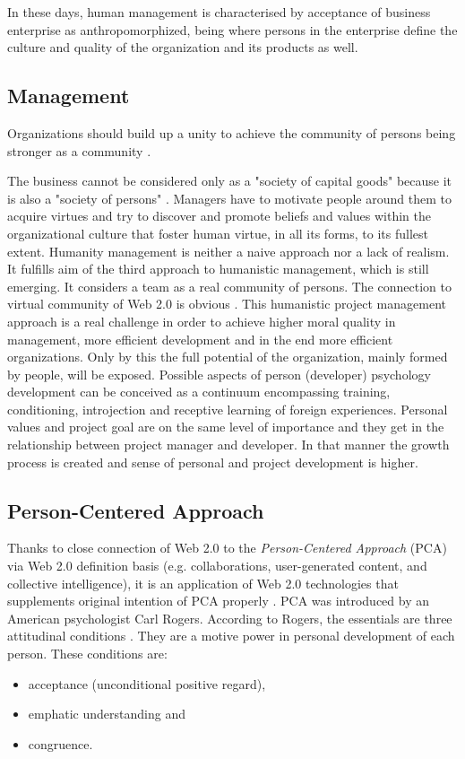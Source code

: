 \documentclass[graybox]{svmult}
\begin{document}
In these days, human management is characterised by acceptance of business
enterprise as anthropomorphized, being where persons in the enterprise define
the culture and quality of the organization and its products as well.

\subsection{Management}
Organizations should build up a unity to achieve the community of persons
being stronger as a community \cite{mele2003challenge}.

The business cannot be considered only as a "society of capital goods" because
it is also a "society of persons" \cite{paul1991centesimus}. Managers have to
motivate people around them to
acquire virtues and try to discover and promote beliefs and values within the
organizational culture that foster human virtue, in all its forms, to its
fullest extent. Humanity management is neither a naive approach nor a lack of
realism. It fulfills aim of the third approach to humanistic management, which
is still emerging. It considers a team as a real community of persons. The
connection to virtual community of Web 2.0 is obvious
\cite{motschnig2002learning}. This
humanistic project management approach is a real challenge in order to achieve
higher moral quality in management, more efficient development and in the
end more efficient organizations. Only by this the full potential of
the organization, mainly formed by people, will be exposed. Possible
aspects of person (developer) psychology development can be conceived as a
continuum encompassing training, conditioning, introjection and receptive
learning of foreign experiences. Personal values and project goal are on the
same level of importance and they get in the relationship between project
manager and developer. In that manner the growth process is created and sense
of personal and project development is higher.

\subsection{Person-Centered Approach}
Thanks to close connection of Web 2.0 to the \emph{Person-Centered Approach}
(PCA) via Web 2.0 definition basis (e.g. collaborations, user-generated
content, and collective intelligence), it is an application of Web 2.0
technologies that supplements original intention of PCA properly
\cite{derntl2004r}. PCA was introduced by an American psychologist Carl
Rogers. According to Rogers, the essentials are three attitudinal conditions
\cite{rogers1979foundations}. They are a motive power in personal development
of each person. These conditions are:
\begin{itemize}
\item acceptance (unconditional positive regard),
\item emphatic understanding and
\item congruence.
\end{itemize}
\end{document}
